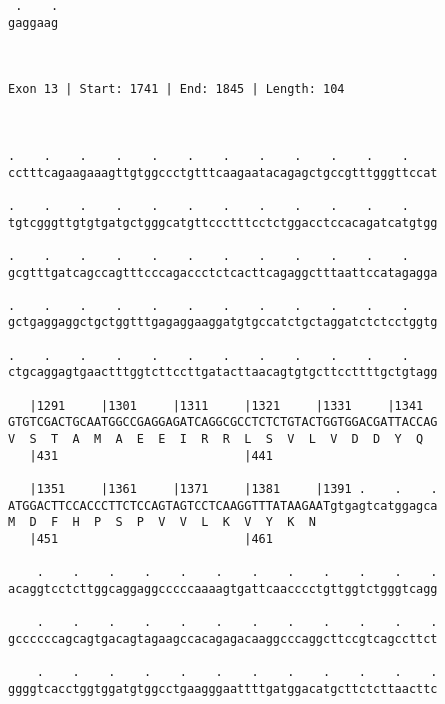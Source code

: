 \documentclass{article}
\begin{document}
\begin{Verbatim}
 .    .
gaggaag
       
       
 
Exon 13 | Start: 1741 | End: 1845 | Length: 104



.    .    .    .    .    .    .    .    .    .    .    .    
cctttcagaagaaagttgtggccctgtttcaagaatacagagctgccgtttgggttccat
                                                            
.    .    .    .    .    .    .    .    .    .    .    .    
tgtcgggttgtgtgatgctgggcatgttccctttcctctggacctccacagatcatgtgg
                                                            
.    .    .    .    .    .    .    .    .    .    .    .    
gcgtttgatcagccagtttcccagaccctctcacttcagaggctttaattccatagagga
                                                            
.    .    .    .    .    .    .    .    .    .    .    .    
gctgaggaggctgctggtttgagaggaaggatgtgccatctgctaggatctctcctggtg
                                                            
.    .    .    .    .    .    .    .    .    .    .    .    
ctgcaggagtgaactttggtcttccttgatacttaacagtgtgcttccttttgctgtagg
                                                            
   |1291     |1301     |1311     |1321     |1331     |1341  
GTGTCGACTGCAATGGCCGAGGAGATCAGGCGCCTCTCTGTACTGGTGGACGATTACCAG
V  S  T  A  M  A  E  E  I  R  R  L  S  V  L  V  D  D  Y  Q  
   |431                          |441                       
  
   |1351     |1361     |1371     |1381     |1391 .    .    .
ATGGACTTCCACCCTTCTCCAGTAGTCCTCAAGGTTTATAAGAATgtgagtcatggagca
M  D  F  H  P  S  P  V  V  L  K  V  Y  K  N                 
   |451                          |461                       
  
    .    .    .    .    .    .    .    .    .    .    .    .
acaggtcctcttggcaggaggcccccaaaagtgattcaacccctgttggtctgggtcagg
                                                            
    .    .    .    .    .    .    .    .    .    .    .    .
gccccccagcagtgacagtagaagccacagagacaaggcccaggcttccgtcagccttct
                                                            
    .    .    .    .    .    .    .    .    .    .    .    .
ggggtcacctggtggatgtggcctgaagggaattttgatggacatgcttctcttaacttc
                                                            

\end{Verbatim}
\end{document}
